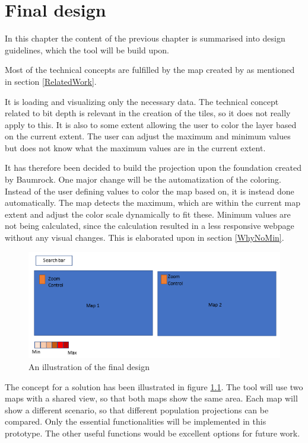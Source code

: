 \chapter{Final design}\label{CFinalDesign}

In this chapter the content of the previous chapter is summarised into design guidelines, which the tool will be build upon. 


Most of the technical concepts are fulfilled by the map created by \citet{Baumrocks} as mentioned in section \ref{RelatedWork}.

It is loading and visualizing only the necessary data. The technical concept related to bit depth is relevant in the creation of the tiles, so it does not really apply to this. 
It is also to some extent allowing the user to color the layer based on the current extent. The user can adjust the maximum and minimum values but does not know what the maximum values are in the current extent.

It has therefore been decided to build the projection upon the foundation created by Baumrock. One major change will be the automatization of the coloring. Instead of the user defining values to color the map based on, it is instead done automatically. The map detects the maximum, which are within the current map extent and adjust the color scale dynamically to fit these. Minimum values are not being calculated, since the calculation resulted in a less responsive webpage without any visual changes. This is elaborated upon in section \ref{WhyNoMin}. 

\begin{figure} [H]
	\centering
	\includegraphics[width=.8\textwidth]{Pictures/FinalDesign}
	\caption{An illustration of the final design}
	\label{FinalDesignFig}
\end{figure}

The concept for a solution has been illustrated in figure \ref{FinalDesignFig}. The tool will use two maps with a shared view, so that both maps show the same area. Each map will show a different scenario, so that different population projections can be compared. Only the essential functionalities will be implemented in this prototype. The other useful functions would be excellent options for future work.


